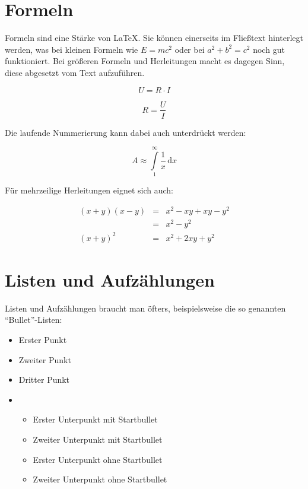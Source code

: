 \section{Formeln}
\label{text:formeln}
Formeln sind eine Stärke von \LaTeX . Sie können einerseits im Fließtext hinterlegt
werden, was bei kleinen Formeln
wie $ E=mc^2 $ oder bei \(a^2+b^2=c^2\) noch %
gut funktioniert. Bei größeren Formeln und Herleitungen macht es
dagegen Sinn, diese abgesetzt vom Text aufzuführen.

\begin{equation}
U=R\cdot I
\label{formel:ohm}
\end{equation}

\begin{equation}
R=\frac{U}{I}
\end{equation}

Die laufende Nummerierung kann dabei auch unterdrückt werden:

\begin{displaymath}
A\approx\int\limits_{1}^{\infty}\frac{1}{x}\,\mathrm{d}x
\end{displaymath}

Für mehrzeilige Herleitungen eignet sich auch:

\begin{eqnarray}
(x+y)(x-y) & = & x^2-xy+xy-y^2 \\
& = & x^2 - y^2 \\
(x+y)^2 & = & x^2+2xy+y^2
\end{eqnarray}



\section{Listen und Aufzählungen}
Listen und Aufzählungen braucht man öfters, beispielsweise
die so genannten "`Bullet"'-Listen:

\begin{itemize}
\item Erster Punkt
\item Zweiter Punkt
\item Dritter Punkt
\item \begin{itemize}
      \item Erster Unterpunkt mit Startbullet
      \item Zweiter Unterpunkt mit Startbullet
      \end{itemize}
      \begin{itemize}
      \item Erster Unterpunkt ohne Startbullet
      \item Zweiter Unterpunkt ohne Startbullet
      \end{itemize}

\end{itemize}

